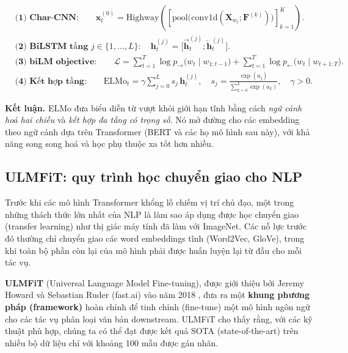 \begin{align*}
  &\textbf{(1) Char-CNN:}\qquad 
  \mathbf{x}_t^{(0)} = \mathrm{Highway}\!\left(\left[\mathrm{pool}\big(\mathrm{conv1d}(\mathbf{X}_{w_t}; \mathbf{F}^{(k)})\big)\right]_{k=1}^{K}\right).\\[4pt]
  &\textbf{(2) BiLSTM tầng } j\in\{1,\dots,L\}:\quad
  \mathbf{h}_t^{(j)} = \big[\overrightarrow{\mathbf{h}}_{t}^{(j)} ; \overleftarrow{\mathbf{h}}_{t}^{(j)}\big].\\[4pt]
  &\textbf{(3) biLM objective:}\qquad
  \mathcal{L} = \sum_{t=1}^{T} \log p_{\rightarrow}\big(w_t \mid w_{1:t-1}\big) 
  + \sum_{t=1}^{T} \log p_{\leftarrow}\big(w_t \mid w_{t+1:T}\big).\\[4pt]
  &\textbf{(4) Kết hợp tầng:}\qquad
  \text{ELMo}_t = \gamma \sum_{j=0}^{L} s_j\, \mathbf{h}_t^{(j)}, 
  \quad s_j = \frac{\exp(a_j)}{\sum_{k=0}^{L}\exp(a_k)},\quad \gamma>0.
\end{align*}

\vspace{4pt}
\noindent\textbf{Kết luận.} ELMo đưa biểu diễn từ vượt khỏi giới hạn tĩnh bằng cách \emph{ngữ cảnh hoá hai chiều} và \emph{kết hợp đa tầng có trọng số}. Nó mở đường cho các embedding theo ngữ cảnh dựa trên Transformer (BERT và các họ mô hình sau này), với khả năng song song hoá và học phụ thuộc xa tốt hơn nhiều.

\subsection{ULMFiT: quy trình học chuyển giao cho NLP}
\label{ssec:ulmfit}

Trước khi các mô hình Transformer khổng lồ chiếm vị trí chủ đạo, một trong những thách thức lớn nhất của NLP là làm sao áp dụng được học chuyển giao (transfer learning) như thị giác máy tính đã làm với ImageNet. Các nỗ lực trước đó thường chỉ chuyển giao các word embeddings tĩnh (Word2Vec, GloVe), trong khi toàn bộ phần còn lại của mô hình phải được huấn luyện lại từ đầu cho mỗi tác vụ.

\textbf{ULMFiT} (Universal Language Model Fine-tuning), được giới thiệu bởi Jeremy Howard và Sebastian Ruder (fast.ai) vào năm 2018 \cite{howard2018universal}, đưa ra một \textbf{khung phương pháp (framework)} hoàn chỉnh để tinh chỉnh (fine-tune) một mô hình ngôn ngữ cho các tác vụ phân loại văn bản downstream. ULMFiT cho thấy rằng, với các kỹ thuật phù hợp, chúng ta có thể đạt được kết quả SOTA (state-of-the-art) trên nhiều bộ dữ liệu chỉ với khoảng 100 mẫu được gán nhãn.


